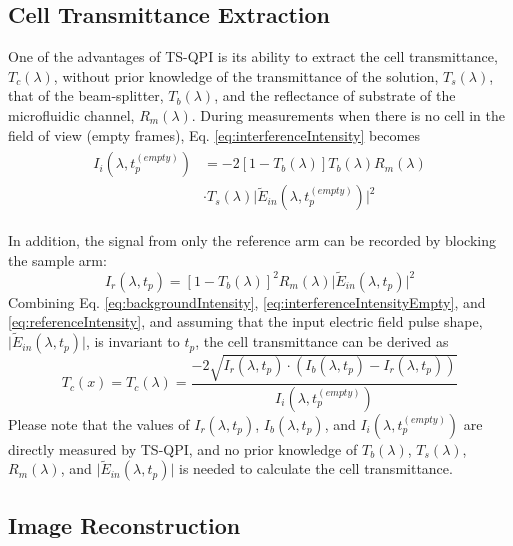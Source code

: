 \documentclass[aps,pra,reprint,superscriptaddress]{revtex4-1}
\begin{document}
\subsection*{Cell Transmittance Extraction} \label{scn:transmittance}
One of the advantages of TS-QPI is its ability to extract the cell transmittance, $T_c(\lambda)$, without prior knowledge of the transmittance of the solution, $T_s(\lambda)$, that of the beam-splitter, $T_b(\lambda)$, and the reflectance of substrate of the microfluidic channel, $R_m(\lambda)$. During measurements when there is no cell in the field of view (empty frames), Eq. \ref{eq:interferenceIntensity} becomes
\begin{align}
\begin{split} \label{eq:interferenceIntensityEmpty}
I_i (\lambda, t_p^{(empty)}) &= - 2 [1-T_b(\lambda)] T_b(\lambda) R_m(\lambda)\\
& \cdot T_s(\lambda) \lvert \tilde{E}_{in}(\lambda, t_p^{(empty)})\rvert^2
\end{split}
\end{align}

In addition, the signal from only the reference arm can be recorded by blocking the sample arm:
\begin{equation} \label{eq:referenceIntensity}
I_r (\lambda, t_p) = [1-T_b(\lambda)]^2 R_m(\lambda) \lvert\tilde{E}_{in}(\lambda, t_p)\rvert^2
\end{equation}
Combining Eq. \ref{eq:backgroundIntensity}, \ref{eq:interferenceIntensityEmpty}, and \ref{eq:referenceIntensity}, and assuming that the input electric field pulse shape, $\lvert \tilde{E}_{in}(\lambda, t_p) \rvert$, is invariant to $t_p$, the cell transmittance can be derived as
\begin{equation}
T_c(x) = T_c(\lambda) = \frac{-2\sqrt{I_r (\lambda, t_p) \cdot (I_b (\lambda, t_p) - I_r (\lambda, t_p))}}{I_i (\lambda, t_p^{(empty)})}
\end{equation}
Please note that the values of $I_r (\lambda, t_p)$, $I_b (\lambda, t_p)$, and $I_i (\lambda, t_p^{(empty)})$ are directly measured by TS-QPI, and no prior knowledge of $T_b(\lambda)$, $T_s(\lambda)$, $R_m(\lambda)$, and $\lvert \tilde{E}_{in}(\lambda, t_p)\rvert$ is needed to calculate the cell transmittance.

\subsection*{Image Reconstruction}
\end{document}
